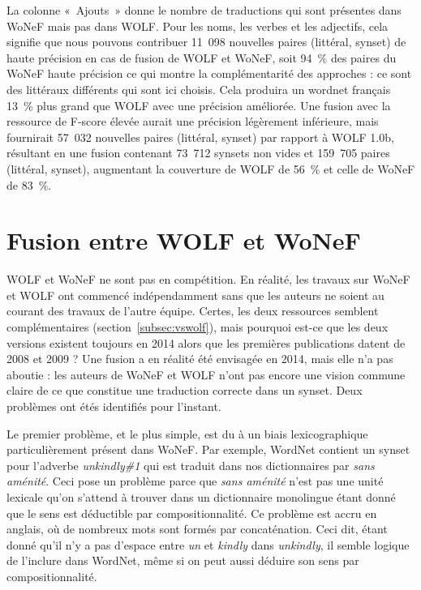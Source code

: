 La colonne «~Ajouts~» donne le nombre de traductions qui sont présentes dans
WoNeF mais pas dans WOLF. Pour les noms, les verbes et les adjectifs, cela
signifie que nous pouvons contribuer 11~098 nouvelles paires (littéral, synset)
de haute précision en cas de fusion de WOLF et WoNeF, soit 94~\% des paires du
WoNeF haute précision ce qui montre la complémentarité des approches : ce sont
des littéraux différents qui sont ici choisis. Cela produira un wordnet
français 13~\% plus grand que WOLF avec une précision améliorée. Une fusion
avec la ressource de F-score élevée aurait une précision légèrement inférieure,
mais fournirait 57~032 nouvelles paires (littéral, synset) par rapport à WOLF
1.0b, résultant en une fusion contenant 73~712 synsets non vides et 159~705
paires (littéral, synset), augmentant la couverture de WOLF de 56~\% et celle
de WoNeF de 83~\%.

\section{Fusion entre WOLF et WoNeF}

WOLF et WoNeF ne sont pas en compétition. En réalité, les travaux sur WoNeF et
WOLF ont commencé indépendamment sans que les auteurs ne soient au courant des
travaux de l'autre équipe. Certes, les deux ressources semblent complémentaires
(section~\ref{subsec:vswolf}), mais pourquoi est-ce que les deux versions
existent toujours en 2014 alors que les premières publications datent de 2008
et 2009 ?  Une fusion a en réalité été envisagée en 2014, mais elle n'a pas
aboutie : les auteurs de WoNeF et WOLF n'ont pas encore une vision commune
claire de ce que constitue une traduction correcte dans un synset. Deux
problèmes ont étés identifiés pour l'instant.

Le premier problème, et le plus simple, est du à un biais lexicographique
particulièrement présent dans WoNeF. Par exemple, WordNet contient un synset
pour l'adverbe \textit{unkindly\#1} qui est traduit dans nos dictionnaires par
\textit{sans aménité}. Ceci pose un problème parce que \textit{sans aménité}
n'est pas une unité lexicale qu'on s'attend à trouver dans un dictionnaire
monolingue étant donné que le sens est déductible par compositionnalité. Ce
problème est accru en anglais, où de nombreux mots sont formés par
concaténation. Ceci dit, étant donné qu'il n'y a pas d'espace entre \textit{un}
et \textit{kindly} dans \textit{unkindly}, il semble logique de l'inclure dans
WordNet, même si on peut aussi déduire son sens par compositionnalité.

